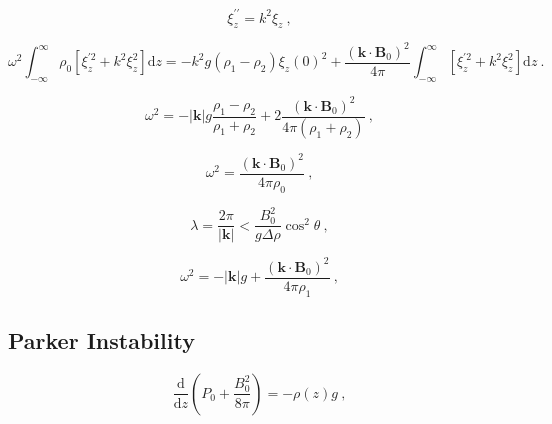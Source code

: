 \documentclass[12pt,a4paper]{article}
\renewcommand{\vec}[1]{\boldsymbol{#1}}
\newcommand{\dif}{\mathrm{d}}
\begin{document}
\begin{equation*}
\xi_z^{\prime \prime} = k^2 \xi_z ~,
\end{equation*}


\begin{equation}
\omega^2 \int_{-\infty}^\infty \rho_0 [\xi_z^{\prime 2}  + k^2 \xi_z^2 ] \dif z = -k^2 g(\rho_1 -\rho_2) \xi_z(0)^2 +\frac{(\vec{k} \cdot \vec{B}_0)^2}{4\pi} \int_{-\infty}^\infty [\xi_z^{\prime 2}  + k^2 \xi_z^2 ] \dif z ~.
\end{equation}

\begin{equation}
\omega^2 = -|\vec{k}| g \frac{\rho_1 -\rho_2}{\rho_1 +\rho_2} + 2\frac{(\vec{k} \cdot \vec{B}_0)^2}{4\pi(\rho_1 +\rho_2)} ~,
\end{equation}

\begin{equation*}
\omega^2 = \frac{(\vec{k} \cdot \vec{B}_0)^2}{4\pi \rho_0} ~,
\end{equation*}



\begin{equation*}
\lambda = \frac{2\pi}{|\vec{k}|} < \frac{B_0^2}{g\Delta \rho} \cos^2 \theta ~,
\end{equation*}



\begin{equation*}
\omega^2 = -|\vec{k}| g + \frac{(\vec{k} \cdot \vec{B}_0)^2}{4\pi \rho_1} ~,
\end{equation*}





























\subsection{Parker Instability}

\begin{equation*}
\frac{\dif}{\dif z} \left(P_0 +\frac{B_0^2}{8\pi} \right) = -\rho(z) g ~,
\end{equation*}
\end{document}

